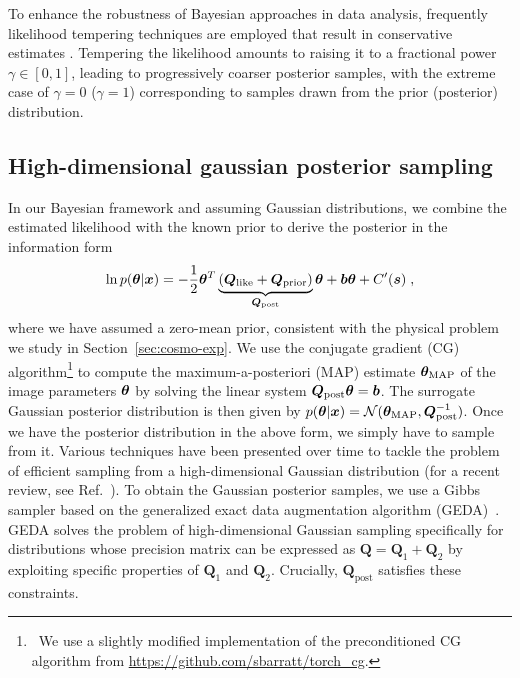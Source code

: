 To enhance the robustness of Bayesian approaches in data analysis, frequently likelihood tempering techniques are employed that result in conservative estimates \cite{Holmes:2017aa, Jasche:2019aa}. 
Tempering the likelihood amounts to raising it to a fractional power $\gamma \in [0, 1]$, leading to progressively coarser posterior samples, with the extreme case of $\gamma=0$ ($\gamma = 1$) corresponding to samples drawn from the prior (posterior) distribution.


\subsection{High-dimensional gaussian posterior sampling} \label{subsec:cosmo-geda}
In our Bayesian framework and assuming Gaussian distributions, we combine the estimated likelihood with the known prior to derive the posterior in the information form
\begin{equation} \label{eq:cosmo-post}
    \ln p(\bm{\theta}|\bm{x}) = -\frac12 \bm{\theta}^T \underbrace{(\bm Q_{\text{like}}+\bm Q_{\text{prior}})}_{\bm Q_{\text{post}}} \bm{\theta} + \bm b \bm{\theta} + C'(\bm s) \;, 
\end{equation}
where we have assumed a zero-mean prior, consistent with the physical problem we study in Section~\ref{sec:cosmo-exp}.
We use the conjugate gradient (CG) algorithm\footnote{~We use a slightly modified implementation of the preconditioned CG algorithm from \url{https://github.com/sbarratt/torch_cg}.} 
to compute the maximum-a-posteriori (MAP) estimate $\bm{\theta}_{\text{MAP}}$ of the image parameters $\bm{\theta}$ by solving the linear system $\bm Q_{\text{post}} \bm{\theta} = \bm b$.
The surrogate Gaussian posterior distribution is then given by $p(\bm{\theta} | \bm{x}) = \mathcal{N}(\bm{\theta}_{\text{MAP}}, \bm Q_{\text{post}}^{-1})$.
Once we have the posterior distribution in the above form, we simply have to sample from it.
Various techniques have been presented over time to tackle the problem of efficient sampling from a high-dimensional Gaussian distribution (for a recent review, see Ref.~\cite{Vono:2020aa}). 
To obtain the Gaussian posterior samples, we use a Gibbs sampler based on the generalized exact data augmentation algorithm 
(GEDA)~\cite{Marnissi:2019aa}. GEDA solves the problem of high-dimensional Gaussian sampling specifically for distributions whose precision matrix can be expressed as $\bm Q = \bm Q_1 + \bm Q_2$ by exploiting specific properties of $\bm Q_1$ and $\bm Q_2$. Crucially, $\bm Q_{\text{post}}$ satisfies these constraints.

